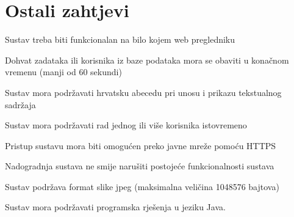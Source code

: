 					
				
				
	
		\section{Ostali zahtjevi}
		
			\begin{packed_item}
				\item Sustav treba biti funkcionalan na bilo kojem web pregledniku 
				\item Dohvat zadataka ili korisnika iz baze podataka mora se obaviti u konačnom vremenu (manji od 60 sekundi)
				\item Sustav mora podržavati hrvatsku abecedu pri unosu i prikazu tekstualnog sadržaja
				\item Sustav mora podržavati rad jednog ili više korisnika istovremeno  
				\item Pristup sustavu mora biti omogućen preko javne mreže pomoću HTTPS
				\item Nadogradnja sustava ne smije narušiti postojeće funkcionalnosti sustava 
				\item Sustav podržava format slike jpeg (maksimalna veličina 1048576 bajtova)
				\item Sustav mora podržavati programska rješenja u jeziku Java.
			\end{packed_item}
				
			
			 
			 
	